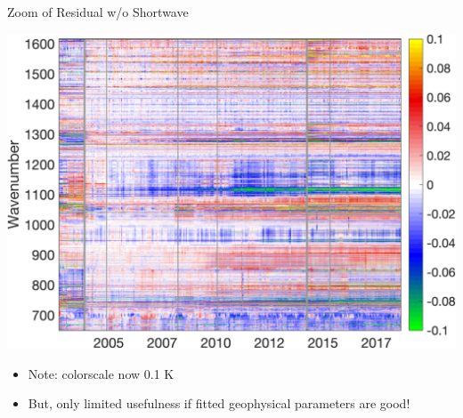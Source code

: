 \documentclass[10pt,t]{beamer}
\begin{document}
\begin{frame}[label={sec:orga34d887}]{Zoom of Residual w/o Shortwave}
\begin{center}
\includegraphics[width=0.8\linewidth]{./Figs/Png/best_co2_anom_resid_no_sw.png}
\end{center}

\begin{itemize}
\item Note: colorscale now \textpm{} 0.1 K
\item But, only limited usefulness if fitted geophysical parameters are good!
\end{itemize}
\end{frame}
\end{document}

